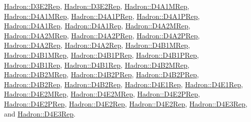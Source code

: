 \mbox{\hyperlink{structHadron_1_1D3E2Rep}{Hadron\+::\+D3\+E2\+Rep}}, \mbox{\hyperlink{structHadron_1_1D3E2Rep}{Hadron\+::\+D3\+E2\+Rep}}, \mbox{\hyperlink{structHadron_1_1D4A1MRep}{Hadron\+::\+D4\+A1\+M\+Rep}}, \mbox{\hyperlink{structHadron_1_1D4A1MRep}{Hadron\+::\+D4\+A1\+M\+Rep}}, \mbox{\hyperlink{structHadron_1_1D4A1PRep}{Hadron\+::\+D4\+A1\+P\+Rep}}, \mbox{\hyperlink{structHadron_1_1D4A1PRep}{Hadron\+::\+D4\+A1\+P\+Rep}}, \mbox{\hyperlink{structHadron_1_1D4A1Rep}{Hadron\+::\+D4\+A1\+Rep}}, \mbox{\hyperlink{structHadron_1_1D4A1Rep}{Hadron\+::\+D4\+A1\+Rep}}, \mbox{\hyperlink{structHadron_1_1D4A2MRep}{Hadron\+::\+D4\+A2\+M\+Rep}}, \mbox{\hyperlink{structHadron_1_1D4A2MRep}{Hadron\+::\+D4\+A2\+M\+Rep}}, \mbox{\hyperlink{structHadron_1_1D4A2PRep}{Hadron\+::\+D4\+A2\+P\+Rep}}, \mbox{\hyperlink{structHadron_1_1D4A2PRep}{Hadron\+::\+D4\+A2\+P\+Rep}}, \mbox{\hyperlink{structHadron_1_1D4A2Rep}{Hadron\+::\+D4\+A2\+Rep}}, \mbox{\hyperlink{structHadron_1_1D4A2Rep}{Hadron\+::\+D4\+A2\+Rep}}, \mbox{\hyperlink{structHadron_1_1D4B1MRep}{Hadron\+::\+D4\+B1\+M\+Rep}}, \mbox{\hyperlink{structHadron_1_1D4B1MRep}{Hadron\+::\+D4\+B1\+M\+Rep}}, \mbox{\hyperlink{structHadron_1_1D4B1PRep}{Hadron\+::\+D4\+B1\+P\+Rep}}, \mbox{\hyperlink{structHadron_1_1D4B1PRep}{Hadron\+::\+D4\+B1\+P\+Rep}}, \mbox{\hyperlink{structHadron_1_1D4B1Rep}{Hadron\+::\+D4\+B1\+Rep}}, \mbox{\hyperlink{structHadron_1_1D4B1Rep}{Hadron\+::\+D4\+B1\+Rep}}, \mbox{\hyperlink{structHadron_1_1D4B2MRep}{Hadron\+::\+D4\+B2\+M\+Rep}}, \mbox{\hyperlink{structHadron_1_1D4B2MRep}{Hadron\+::\+D4\+B2\+M\+Rep}}, \mbox{\hyperlink{structHadron_1_1D4B2PRep}{Hadron\+::\+D4\+B2\+P\+Rep}}, \mbox{\hyperlink{structHadron_1_1D4B2PRep}{Hadron\+::\+D4\+B2\+P\+Rep}}, \mbox{\hyperlink{structHadron_1_1D4B2Rep}{Hadron\+::\+D4\+B2\+Rep}}, \mbox{\hyperlink{structHadron_1_1D4B2Rep}{Hadron\+::\+D4\+B2\+Rep}}, \mbox{\hyperlink{structHadron_1_1D4E1Rep}{Hadron\+::\+D4\+E1\+Rep}}, \mbox{\hyperlink{structHadron_1_1D4E1Rep}{Hadron\+::\+D4\+E1\+Rep}}, \mbox{\hyperlink{structHadron_1_1D4E2MRep}{Hadron\+::\+D4\+E2\+M\+Rep}}, \mbox{\hyperlink{structHadron_1_1D4E2MRep}{Hadron\+::\+D4\+E2\+M\+Rep}}, \mbox{\hyperlink{structHadron_1_1D4E2PRep}{Hadron\+::\+D4\+E2\+P\+Rep}}, \mbox{\hyperlink{structHadron_1_1D4E2PRep}{Hadron\+::\+D4\+E2\+P\+Rep}}, \mbox{\hyperlink{structHadron_1_1D4E2Rep}{Hadron\+::\+D4\+E2\+Rep}}, \mbox{\hyperlink{structHadron_1_1D4E2Rep}{Hadron\+::\+D4\+E2\+Rep}}, \mbox{\hyperlink{structHadron_1_1D4E3Rep}{Hadron\+::\+D4\+E3\+Rep}}, and \mbox{\hyperlink{structHadron_1_1D4E3Rep}{Hadron\+::\+D4\+E3\+Rep}}.



